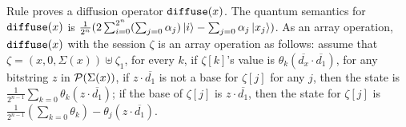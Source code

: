 Rule  proves a diffusion operator $\texttt{diffuse}(x)$.
The quantum semantics for $\texttt{diffuse}(x)$ is $\frac{1}{2^{n}}(2\sum_{i=0}^{2^n}(\sum_{j=0}\alpha_j)\left\vert{i}\right\rangle - \sum_{j=0}\alpha_j\left\vert{x_j}\right\rangle)$.
As an array operation, $\texttt{diffuse}(x)$ with the session $\zeta$ is an array operation as follows:
assume that $\zeta=(x,0,\Sigma(x))\uplus\zeta_1$, for every $k$,
if $\zeta[k]$'s value is $\theta_k(\overline{d_x}\cdot \overline{d_1})$,
for any bitstring $z$ in $\mathcal{P}(\Sigma(x))$, if $z\cdot \overline{d_1}$
is not a base for $\zeta[j]$ for any $j$, then the state is
$\frac{1}{2^{n-1}}\sum_{k=0}\theta_k(z\cdot \overline{d_1})$;
if the base of $\zeta[j]$ is $z\cdot \overline{d_1}$,
then the state for $\zeta[j]$ is $\frac{1}{2^{n-1}}(\sum_{k=0}\theta_k)-\theta_j(z\cdot \overline{d_1})$.






